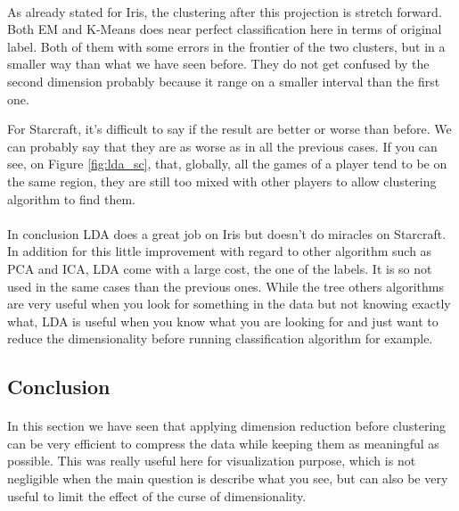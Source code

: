 \documentclass[twocolumn,a4paper,10pt]{article}
\begin{document}
\paragraph{}

As already stated for Iris, the clustering after this projection is
stretch forward. Both EM and K-Means does near perfect classification
here in terms of original label. Both of them with some errors in
the frontier of the two clusters, but in a smaller way than what we
have seen before. They do not get confused by the second dimension
probably because it range on a smaller interval than the first one.

For Starcraft, it's difficult to say if the result are better or worse
than before. We can probably say that they are as worse as in all
the previous cases. If you can see, on Figure \ref{fig:lda_sc}, that,
globally, all the games of a player tend to be on the same region,
they are still too mixed with other players to allow clustering algorithm
to find them.

\paragraph{}

In conclusion LDA does a great job on Iris but doesn't do miracles
on Starcraft. In addition for this little improvement with regard
to other algorithm such as PCA and ICA, LDA come with a large cost,
the one of the labels. It is so not used in the same cases than the
previous ones. While the tree others algorithms are very useful when
you look for something in the data but not knowing exactly what, LDA
is useful when you know what you are looking for and just want to
reduce the dimensionality before running classification algorithm
for example.

\subsection{Conclusion}


\paragraph{}

In this section we have seen that applying dimension reduction before
clustering can be very efficient to compress the data while keeping
them as meaningful as possible. This was really useful here for visualization
purpose, which is not negligible when the main question is describe
what you see, but can also be very useful to limit the effect of the
curse of dimensionality.
\end{document}

